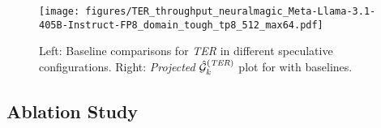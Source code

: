 \begin{figure}[!ht]
    \centering
    \texttt{[image: figures/TER\_throughput\_neuralmagic\_Meta-Llama-3.1-405B-Instruct-FP8\_domain\_tough\_tp8\_512\_max64.pdf]}
    \caption{Left: Baseline comparisons for \textit{TER} in different speculative configurations. Right: \textit{Projected} $\hat{{\mathcal{G}}}^{(\textit{TER})}_k$ plot for \alg{} with baselines.}
    \label{fig:TER-figure}
\end{figure}
\begin{table}[t]
    \centering
    \caption{Projected throughput $\hat{\gG}^{(\textit{TER})}$ improvement based on \textit{TER} metric improvement, realizable under a parallelized speculative decoding pipeline.}
    \label{tab:potential}
    \vspace{-3mm}
\end{table}

\subsection{Ablation Study}

